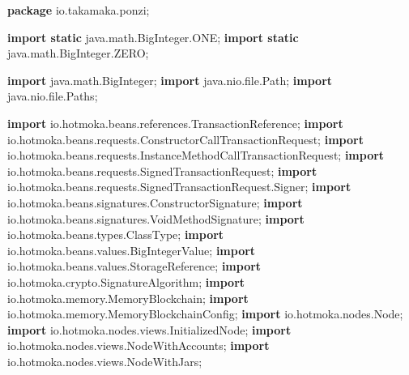 \documentclass[a4paper,]{book}
\newenvironment{Shaded}{\begin{snugshade}}{\end{snugshade}}
\newcommand{\ImportTok}[1]{\textcolor[rgb]{1.00,0.33,0.00}{#1}}
\newcommand{\KeywordTok}[1]{\textcolor[rgb]{0.12,0.11,0.11}{\textbf{#1}}}
\renewenvironment{Shaded}{\begin{snugshade}\small}{\end{snugshade}}
\begin{document}
{\begin{Shaded}
\begin{Highlighting}[]
\KeywordTok{package}\ImportTok{ io.takamaka.ponzi;}

\KeywordTok{import static}\ImportTok{ java.math.BigInteger.ONE;}
\KeywordTok{import static}\ImportTok{ java.math.BigInteger.ZERO;}

\KeywordTok{import}\ImportTok{ java.math.BigInteger;}
\KeywordTok{import}\ImportTok{ java.nio.file.Path;}
\KeywordTok{import}\ImportTok{ java.nio.file.Paths;}

\KeywordTok{import}\ImportTok{ io.hotmoka.beans.references.TransactionReference;}
\KeywordTok{import}\ImportTok{ io.hotmoka.beans.requests.ConstructorCallTransactionRequest;}
\KeywordTok{import}\ImportTok{ io.hotmoka.beans.requests.InstanceMethodCallTransactionRequest;}
\KeywordTok{import}\ImportTok{ io.hotmoka.beans.requests.SignedTransactionRequest;}
\KeywordTok{import}\ImportTok{ io.hotmoka.beans.requests.SignedTransactionRequest.Signer;}
\KeywordTok{import}\ImportTok{ io.hotmoka.beans.signatures.ConstructorSignature;}
\KeywordTok{import}\ImportTok{ io.hotmoka.beans.signatures.VoidMethodSignature;}
\KeywordTok{import}\ImportTok{ io.hotmoka.beans.types.ClassType;}
\KeywordTok{import}\ImportTok{ io.hotmoka.beans.values.BigIntegerValue;}
\KeywordTok{import}\ImportTok{ io.hotmoka.beans.values.StorageReference;}
\KeywordTok{import}\ImportTok{ io.hotmoka.crypto.SignatureAlgorithm;}
\KeywordTok{import}\ImportTok{ io.hotmoka.memory.MemoryBlockchain;}
\KeywordTok{import}\ImportTok{ io.hotmoka.memory.MemoryBlockchainConfig;}
\KeywordTok{import}\ImportTok{ io.hotmoka.nodes.Node;}
\KeywordTok{import}\ImportTok{ io.hotmoka.nodes.views.InitializedNode;}
\KeywordTok{import}\ImportTok{ io.hotmoka.nodes.views.NodeWithAccounts;}
\KeywordTok{import}\ImportTok{ io.hotmoka.nodes.views.NodeWithJars;}


\end{Highlighting}
\end{Shaded}}
\end{document}
